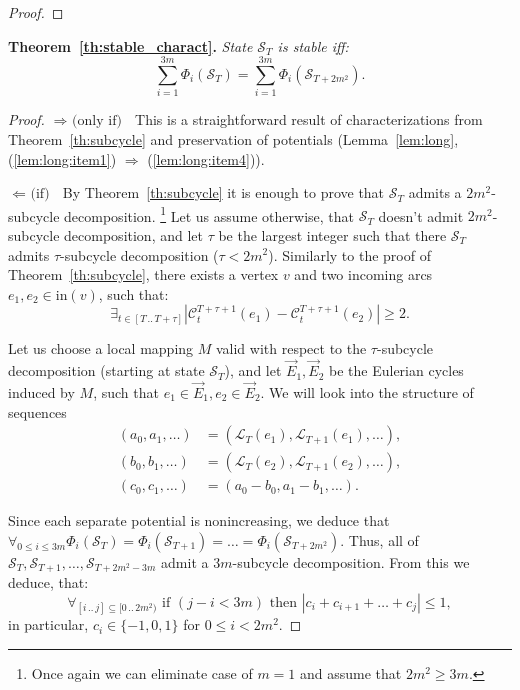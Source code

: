 \documentclass{article}[11pt,letter]
\newcommand{\state}{\mathcal{S}}
\newcommand{\inedg}{\mathrm{in}}
\newcommand{\load}{\mathcal{L}}
\newcommand{\cload}{\mathcal{C}}
\newcommand{\closedrange}[2]{[#1\,..\,#2]}
\newcommand{\halfrange}[2]{[#1\,..\,#2)}
\begin{document}
\begin{proof}
\end{proof}


\noindent\textbf{Theorem~\ref{th:stable_charact}.}
\emph{State $\state_T$ is stable iff:
$$\sum_{i=1}^{3m} \Phi_{i}(\state_T) = \sum_{i=1}^{3m} \Phi_{i}(\state_{T+2m^2}).$$}

\begin{proof}
$\Rightarrow \text{ (only if) }$
This is a straightforward result of characterizations from Theorem~\ref{th:subcycle} and preservation of potentials (Lemma~\ref{lem:long}, (\ref{lem:long:item1}) $\Rightarrow$ (\ref{lem:long:item4})).

$\Leftarrow \text{ (if) }$
By Theorem~\ref{th:subcycle} it is enough to prove that $\state_T$ admits a $2m^2$-subcycle decomposition. \footnote{Once again we can eliminate case of $m=1$ and assume that $2m^2 \ge 3m$.}
Let us assume otherwise, that $\state_T$ doesn't admit $2m^2$-subcycle decomposition, and let $\tau$ be the largest integer such that there $\state_T$ admits $\tau$-subcycle decomposition ($\tau < 2m^2$).
Similarly to the proof of Theorem~\ref{th:subcycle}, there exists a vertex $v$ and two incoming arcs $e_1,e_2 \in \inedg(v)$, such that:
\begin{equation}
\label{eq:bad_discrp2}
\exists_{t\in \closedrange{T}{T+\tau}}  \left|\cload_{t}^{T+\tau+1}(e_1) - \cload_{t}^{T+\tau+1}(e_2)\right| \ge 2.
\end{equation}

Let us choose a local mapping $M$ valid with respect to the $\tau$-subcycle decomposition (starting at state $\state_T$), and let
  $\vec{E}_1,\vec{E}_2$ be the Eulerian cycles induced by $M$,  such that $e_1 \in \vec{E}_1, e_2 \in \vec{E}_2$.
We will look into the structure of sequences
\begin{align*}
(a_0,a_1,\ldots) &= (\load_T(e_1),\load_{T+1}(e_1),\ldots),\\
(b_0,b_1,\ldots) &= (\load_T(e_2),\load_{T+1}(e_2),\ldots),\\
(c_0,c_1,\ldots) &= (a_0-b_0,a_1-b_1,\ldots).
\end{align*}

Since each separate potential is nonincreasing, we deduce that $\forall_{0 \le i \le 3m} \Phi_i(\state_T) = \Phi_i(\state_{T+1}) = \ldots = \Phi_i(\state_{T+2m^2})$. Thus, all of $\state_T,\state_{T+1},\ldots,\state_{T+2m^2-3m}$ admit a $3m$-subcycle decomposition. From this we deduce, that:
\begin{equation}
\label{eq:sequence_property}
\forall_{\closedrange{i}{j} \subseteq \halfrange{0}{2m^2}} \text{ if } (j-i<3m) \text{ then } |c_i +c_{i+1}+\ldots+c_{j}| \le 1,
\end{equation}
in particular, $c_i \in \{-1,0,1\}$ for $0 \le i < 2m^2$.


\end{proof}
\end{document}
